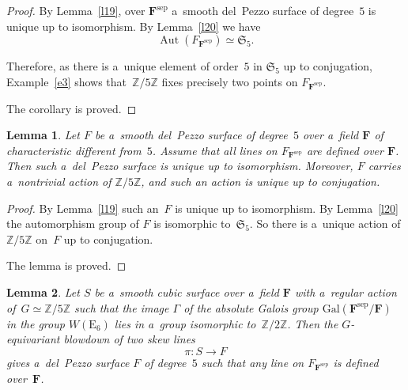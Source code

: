 \documentclass{amsart}
\numberwithin{equation}{section}
\theoremstyle{plain}
\newtheorem{lemma}{Lemma}
\theoremstyle{definition}
\theoremstyle{remark}
\begin{document}
\begin{proof}
By Lemma~\ref{l19}, over $\mathbf{F}^{\mathrm{sep}}$ a~smooth del~Pezzo surface of degree~$5$ is unique up to isomorphism. By Lemma~\ref{l20} we have
$$
\operatorname{Aut}(F_{\mathbf{F}^{\mathrm{sep}}}) \simeq \mathfrak{S}_5.
$$

Therefore, as there is a~unique element of order~$5$ in $\mathfrak{S}_5$ up to conjugation, %
 Example~\ref{e3} shows that~$\mathbb{Z}/5\mathbb{Z}$ fixes precisely two points on $F_{\mathbf{F}^{\mathrm{sep}}}$.

The corollary is proved.
\end{proof}

\begin{lemma}
\label{l21}
Let $F$ be a~smooth del~Pezzo surface of degree~$5$ over a~field $\mathbf{F}$ of characteristic different from~$5$. Assume that all lines on $F_{\mathbf{F}^{\mathrm{sep}}}$ are defined over $\mathbf{F}$. Then such a~del~Pezzo surface is unique up to isomorphism. Moreover, $F$ carries a~nontrivial action of $\mathbb{Z}/5\mathbb{Z}$, and such an action is unique up to conjugation.
\end{lemma}

\begin{proof}
By Lemma~\ref{l19} such an~$F$ is unique up to isomorphism. By Lemma~\ref{l20} the automorphism group of $F$ is isomorphic to~$\mathfrak{S}_5$. So there is a~unique action of $\mathbb{Z}/5\mathbb{Z}$ on~$F$ up to conjugation.

The lemma is proved.
\end{proof}

\begin{lemma}
\label{l22}
Let $S$ be a~smooth cubic surface over a~field $\mathbf{F}$ with a~regular action of~$G \simeq\mathbb{Z}/5\mathbb{Z}$ such that the image $\Gamma$ of the absolute Galois group $\mathrm{Gal}(\mathbf{F}^{\mathrm{sep}}/\mathbf{F})$ in the group $W(\mathrm{E}_6)$ lies in a~group isomorphic to~$\mathbb{Z}/2\mathbb{Z}$. Then the $G$-equivariant blowdown of two skew lines
$$
\pi \colon S \to F
$$
gives a~del~Pezzo surface $F$ of degree~$5$ such that any line on $F_{\mathbf{F}^{\mathrm{sep}}}$ is defined over~$\mathbf{F}$.
\end{lemma}
\end{document}
